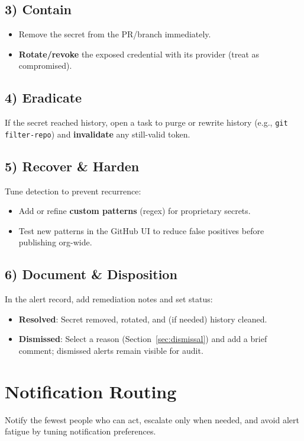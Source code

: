 \documentclass[11pt,a4paper]{article}
\begin{document}
\subsection*{3) Contain}
\begin{itemize}[leftmargin=1.2em]
  \item Remove the secret from the PR/branch immediately.
  \item \textbf{Rotate/revoke} the exposed credential with its provider (treat as compromised).
\end{itemize}

\subsection*{4) Eradicate}
If the secret reached history, open a task to purge or rewrite history (e.g., \texttt{git filter-repo}) and \textbf{invalidate} any still-valid token.

\subsection*{5) Recover \& Harden}
Tune detection to prevent recurrence:
\begin{itemize}[leftmargin=1.2em]
  \item Add or refine \textbf{custom patterns} (regex) for proprietary secrets.
  \item Test new patterns in the GitHub UI to reduce false positives before publishing org-wide.
\end{itemize}

\subsection*{6) Document \& Disposition}
In the alert record, add remediation notes and set status:
\begin{itemize}[leftmargin=1.2em]
  \item \textbf{Resolved}: Secret removed, rotated, and (if needed) history cleaned.
  \item \textbf{Dismissed}: Select a reason (Section~\ref{sec:dismissal}) and add a brief comment; dismissed alerts remain visible for audit.
\end{itemize}

\section{Notification Routing}
\begin{callout}[Principles]
Notify the fewest people who can act, escalate only when needed, and avoid alert fatigue by tuning notification preferences.
\end{callout}
\end{document}
